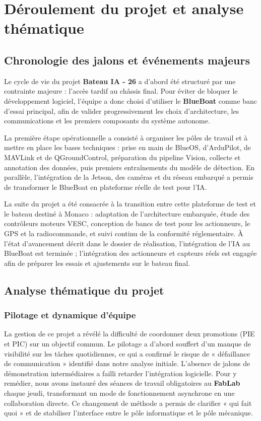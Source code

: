 \documentclass[11pt,letterpaper]{article}
\begin{document}
\section{Déroulement du projet et analyse thématique}

\subsection{Chronologie des jalons et événements majeurs}
Le cycle de vie du projet \textbf{Bateau IA - 26} a d'abord été structuré par une contrainte majeure : l'accès tardif au châssis final. Pour éviter de bloquer le développement logiciel, l'équipe a donc choisi d'utiliser le \textbf{BlueBoat} comme banc d'essai principal, afin de valider progressivement les choix d'architecture, les communications et les premiers composants du système autonome.

La première étape opérationnelle a consisté à organiser les pôles de travail et à mettre en place les bases techniques : prise en main de BlueOS, d'ArduPilot, de MAVLink et de QGroundControl, préparation du pipeline Vision, collecte et annotation des données, puis premiers entraînements du modèle de détection. En parallèle, l'intégration de la Jetson, des caméras et du réseau embarqué a permis de transformer le BlueBoat en plateforme réelle de test pour l'IA.

La suite du projet a été consacrée à la transition entre cette plateforme de test et le bateau destiné à Monaco : adaptation de l'architecture embarquée, étude des contrôleurs moteurs VESC, conception de bancs de test pour les actionneurs, le GPS et la radiocommande, et suivi continu de la conformité réglementaire. À l'état d'avancement décrit dans le dossier de réalisation, l'intégration de l'IA au BlueBoat est terminée ; l'intégration des actionneurs et capteurs réels est engagée afin de préparer les essais et ajustements sur le bateau final.

\subsection{Analyse thématique du projet}

\subsubsection{Pilotage et dynamique d'équipe}
La gestion de ce projet a révélé la difficulté de coordonner deux promotions (PIE et PIC) sur un objectif commun. Le pilotage a d'abord souffert d'un manque de visibilité sur les tâches quotidiennes, ce qui a confirmé le risque de « défaillance de communication » identifié dans notre analyse initiale. L'absence de jalons de démonstration intermédiaires a failli retarder l'intégration logicielle. Pour y remédier, nous avons instauré des séances de travail obligatoires au \textbf{FabLab} chaque jeudi, transformant un mode de fonctionnement asynchrone en une collaboration directe. Ce changement de méthode a permis de clarifier « qui fait quoi » et de stabiliser l'interface entre le pôle informatique et le pôle mécanique.
\end{document}
